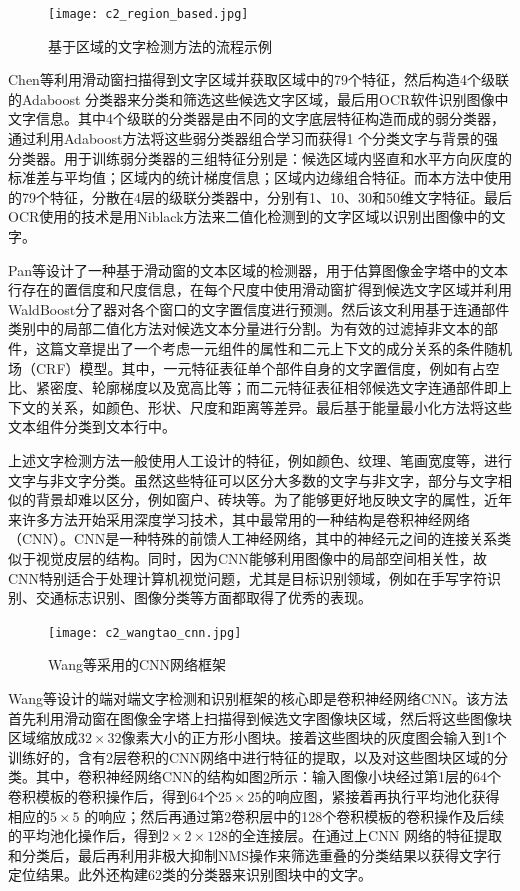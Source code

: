     \begin{figure}[!h]
    \centering
    \texttt{[image: c2\_region\_based.jpg]}
    \caption{基于区域的文字检测方法的流程示例}
    \label{fig.c2_region_based}
    \end{figure}

    Chen等\cite{Chen2004Detecting}利用滑动窗扫描得到文字区域并获取区域中的79个特征，然后构造4个级联的Adaboost 分类器来分类和筛选这些候选文字区域，最后用OCR软件识别图像中文字信息。其中4个级联的分类器是由不同的文字底层特征构造而成的弱分类器，通过利用Adaboost方法将这些弱分类器组合学习而获得1 个分类文字与背景的强分类器。用于训练弱分类器的三组特征分别是：候选区域内竖直和水平方向灰度的标准差与平均值；区域内的统计梯度信息；区域内边缘组合特征。而本方法中使用的79个特征，分散在4层的级联分类器中，分别有1、10、30和50维文字特征。最后OCR使用的技术是用Niblack方法来二值化检测到的文字区域以识别出图像中的文字。

    Pan等\cite{Pan2011A}设计了一种基于滑动窗的文本区域的检测器，用于估算图像金字塔中的文本行存在的置信度和尺度信息，在每个尺度中使用滑动窗扩得到候选文字区域并利用WaldBoost分了器对各个窗口的文字置信度进行预测。然后该文利用基于连通部件类别中的局部二值化方法对候选文本分量进行分割。为有效的过滤掉非文本的部件，这篇文章提出了一个考虑一元组件的属性和二元上下文的成分关系的条件随机场（CRF）模型。其中，一元特征表征单个部件自身的文字置信度，例如有占空比、紧密度、轮廓梯度以及宽高比等；而二元特征表征相邻候选文字连通部件即上下文的关系，如颜色、形状、尺度和距离等差异。最后基于能量最小化方法将这些文本组件分类到文本行中。

    上述文字检测方法一般使用人工设计的特征，例如颜色、纹理、笔画宽度等，进行文字与非文字分类。虽然这些特征可以区分大多数的文字与非文字，部分与文字相似的背景却难以区分，例如窗户、砖块等。为了能够更好地反映文字的属性，近年来许多方法开始采用深度学习技术，其中最常用的一种结构是卷积神经网络（CNN）。CNN是一种特殊的前馈人工神经网络，其中的神经元之间的连接关系类似于视觉皮层的结构。同时，因为CNN能够利用图像中的局部空间相关性，故CNN特别适合于处理计算机视觉问题，尤其是目标识别领域，例如在手写字符识别、交通标志识别、图像分类等方面都取得了优秀的表现。

    \begin{figure}[!h]
    \centering
    \texttt{[image: c2\_wangtao\_cnn.jpg]}
    \caption{Wang等\cite{Wang2012End}采用的CNN网络框架}
    \label{fig.c2_wangtao_cnn}
    \end{figure}

    Wang等\cite{Wang2012End}设计的端对端文字检测和识别框架的核心即是卷积神经网络CNN。该方法首先利用滑动窗在图像金字塔上扫描得到候选文字图像块区域，然后将这些图像块区域缩放成$32\times32$像素大小的正方形小图块。接着这些图块的灰度图会输入到1个训练好的，含有2层卷积的CNN网络中进行特征的提取，以及对这些图块区域的分类。其中，卷积神经网络CNN的结构如图\ref{fig.c2_wangtao_cnn}所示：输入图像小块经过第1层的64个卷积模板的卷积操作后，得到64个$25\times25$的响应图，紧接着再执行平均池化获得相应的$5\times5$ 的响应；然后再通过第2卷积层中的128个卷积模板的卷积操作及后续的平均池化操作后，得到$2\times2\times128$的全连接层。在通过上CNN 网络的特征提取和分类后，最后再利用非极大抑制NMS操作来筛选重叠的分类结果以获得文字行定位结果。此外还构建62类的分类器来识别图块中的文字。

